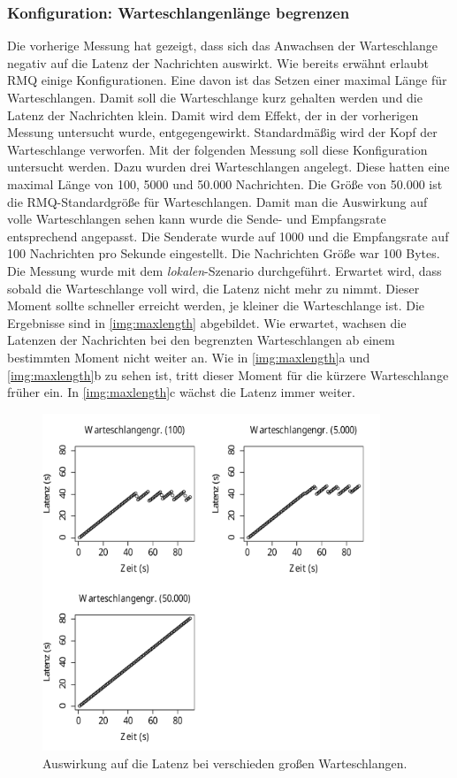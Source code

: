 \subsubsection{Konfiguration: Warteschlangenlänge begrenzen}
\label{sec:maxlength}
Die vorherige Messung hat gezeigt, dass sich das Anwachsen der Warteschlange negativ auf die Latenz der Nachrichten auswirkt. Wie bereits erwähnt erlaubt RMQ einige Konfigurationen. Eine davon ist das Setzen einer maximal Länge für Warteschlangen. Damit soll die Warteschlange kurz gehalten werden und die Latenz der Nachrichten klein. Damit wird dem Effekt, der in der vorherigen Messung untersucht wurde, entgegengewirkt. Standardmäßig wird der Kopf der Warteschlange verworfen. Mit der folgenden Messung soll diese Konfiguration untersucht werden. Dazu wurden drei Warteschlangen angelegt. Diese hatten eine maximal Länge von 100, 5000 und 50.000 Nachrichten. Die Größe von 50.000 ist die RMQ-Standardgröße für Warteschlangen. Damit man die Auswirkung auf volle Warteschlangen sehen kann wurde die Sende- und Empfangsrate entsprechend angepasst. Die Senderate wurde auf 1000 und die Empfangsrate auf 100 Nachrichten pro Sekunde eingestellt. Die Nachrichten Größe war 100 Bytes. Die Messung wurde mit dem \textit{lokalen}-Szenario durchgeführt. Erwartet wird, dass sobald die Warteschlange voll wird, die Latenz nicht mehr zu nimmt. Dieser Moment sollte schneller erreicht werden, je kleiner die Warteschlange ist.
Die Ergebnisse sind in \autoref{img:maxlength} abgebildet. Wie erwartet, wachsen die Latenzen der Nachrichten bei den begrenzten Warteschlangen ab einem bestimmten Moment nicht weiter an. Wie in \autoref{img:maxlength}a und \autoref{img:maxlength}b zu sehen ist, tritt dieser Moment für die kürzere Warteschlange früher ein. In \autoref{img:maxlength}c wächst die Latenz immer weiter.
\begin{figure}[t]
\center
  \includegraphics[width=0.9\textwidth]{images/measurement/max-length.pdf}
  \caption{Auswirkung auf die Latenz bei verschieden großen Warteschlangen.}
  \label{img:maxlength}
\end{figure}
